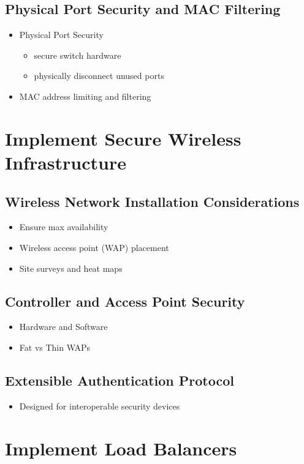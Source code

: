 	\subsection {Physical Port Security and MAC Filtering}
		\begin{itemize}
			\item Physical Port Security
				\begin{itemize}
					\item secure switch hardware
					\item physically disconnect unused ports
				\end{itemize}
			\item MAC address limiting and filtering
		\end{itemize}

\section {Implement Secure Wireless Infrastructure}
	\subsection {Wireless Network Installation Considerations}
		\begin{itemize}
			\item Ensure max availability
			\item Wireless access point (WAP) placement
			\item Site surveys and heat maps
		\end{itemize}
	\subsection {Controller and Access Point Security}
		\begin{itemize}
			\item Hardware and Software
			\item Fat vs Thin WAPs
		\end{itemize}
	\subsection {Extensible Authentication Protocol}
		\begin{itemize}
			\item Designed for interoperable security devices
		\end{itemize}

\section {Implement Load Balancers}

